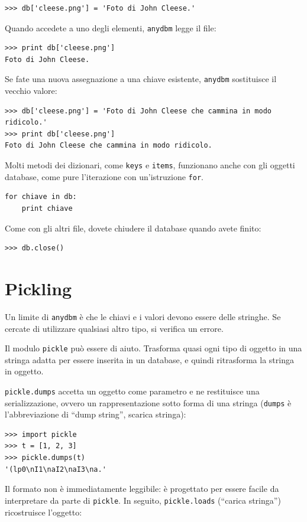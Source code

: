 \documentclass[10pt]{book}
\begin{document}
\begin{verbatim}
>>> db['cleese.png'] = 'Foto di John Cleese.'
\end{verbatim}
%
Quando accedete a uno degli elementi, {\tt anydbm} legge il file:

\begin{verbatim}
>>> print db['cleese.png']
Foto di John Cleese.
\end{verbatim}
%
Se fate una nuova assegnazione a una chiave esistente, {\tt anydbm} sostituisce il vecchio valore:

\begin{verbatim}
>>> db['cleese.png'] = 'Foto di John Cleese che cammina in modo ridicolo.'
>>> print db['cleese.png']
Foto di John Cleese che cammina in modo ridicolo.
\end{verbatim}
%
Molti metodi dei dizionari, come {\tt keys} e {\tt items}, funzionano anche con gli oggetti database, come pure l'iterazione con un'istruzione {\tt for}.

\begin{verbatim}
for chiave in db:
    print chiave
\end{verbatim}
%
Come con gli altri file, dovete chiudere il database quando avete finito:

\begin{verbatim}
>>> db.close()
\end{verbatim}
%


\section{Pickling}

Un limite di {\tt anydbm} è che le chiavi e i valori devono essere delle stringhe. Se cercate di utilizzare qualsiasi altro tipo, si verifica un errore.

Il modulo {\tt pickle} può essere di aiuto. Trasforma quasi ogni tipo di oggetto in una stringa adatta per essere inserita in un database, e quindi ritrasforma la stringa in oggetto.

{\tt pickle.dumps} accetta un oggetto come parametro e ne restituisce una serializzazione, ovvero un rappresentazione sotto forma di una stringa ({\tt dumps} è l'abbreviazione di ``dump string'', scarica stringa):

\begin{verbatim}
>>> import pickle
>>> t = [1, 2, 3]
>>> pickle.dumps(t)
'(lp0\nI1\naI2\naI3\na.'
\end{verbatim}
%
Il formato non è immediatamente leggibile: è progettato per essere facile da interpretare da parte di {\tt pickle}. In seguito, {\tt pickle.loads}
(``carica stringa'') ricostruisce l'oggetto:
\end{document}
